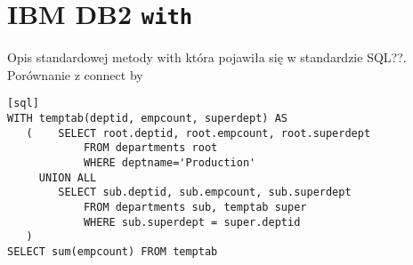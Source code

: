 \section{IBM DB2 \texttt{with}}


Opis standardowej metody with która pojawiła się w standardzie SQL??. Porównanie z connect by

\begin{verbatim}[sql]
WITH temptab(deptid, empcount, superdept) AS
   (    SELECT root.deptid, root.empcount, root.superdept
            FROM departments root
            WHERE deptname='Production'
     UNION ALL
        SELECT sub.deptid, sub.empcount, sub.superdept
            FROM departments sub, temptab super
            WHERE sub.superdept = super.deptid
   )
SELECT sum(empcount) FROM temptab
\end{verbatim}

